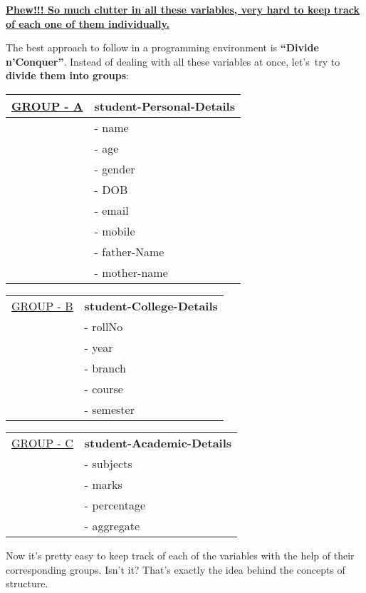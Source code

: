\documentclass[11pt]{article}
\begin{document}
\uline{\textbf{Phew!!! So much clutter in all these variables, very hard to keep track of each
one of them individually.}}

The best approach to follow in a programming environment is \textbf{“Divide
n’Conquer”}. Instead of dealing with all these variables at once, let’s try to
\textbf{divide them into groups}:

\begin{center}
\begin{tabular}{ll}
\hline
\uline{GROUP - A} & \textbf{student-Personal-Details}\\
\hline
 & - name\\
 & - age\\
 & - gender\\
 & - DOB\\
 & - email\\
 & - mobile\\
 & - father-Name\\
 & - mother-name\\
\hline
\end{tabular}
\end{center}

\begin{center}
\begin{tabular}{ll}
\hline
\uline{GROUP - B} & \textbf{student-College-Details}\\
 & - rollNo\\
 & - year\\
 & - branch\\
 & - course\\
 & - semester\\
\hline
\end{tabular}
\end{center}

\begin{center}
\begin{tabular}{ll}
\hline
\uline{GROUP - C} & \textbf{student-Academic-Details}\\
 & - subjects\\
 & - marks\\
 & - percentage\\
 & - aggregate\\
\hline
\end{tabular}
\end{center}

Now it’s pretty easy to keep track of each of the variables with the help of their
corresponding groups. Isn’t it? That’s exactly the idea behind the concepts of structure.
\end{document}
